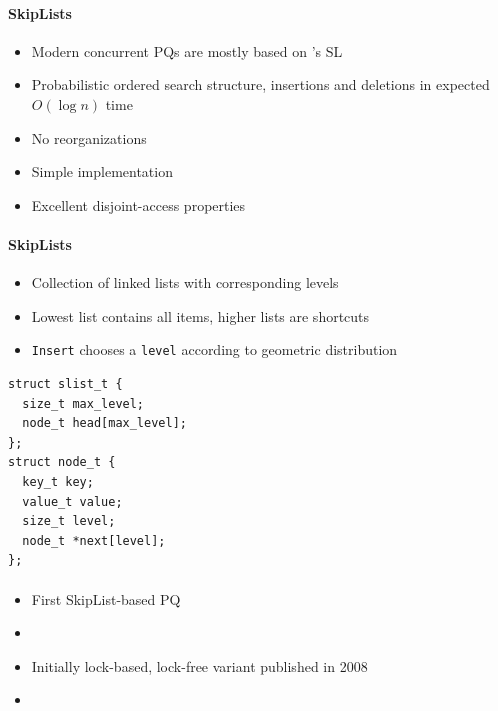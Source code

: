 \documentclass[usenames,dvipsnames]{beamer}
\begin{document}
\begin{frame}{}
\framesubtitle{SkipLists}

\begin{itemize}
\item Modern concurrent \acp{PQ} are mostly based on \citeauthor{pugh1990skip}'s \ac{SL}
\item Probabilistic ordered search structure, insertions and deletions in expected $O(\log n)$ time
\item No reorganizations
\item Simple implementation
\item Excellent disjoint-access properties
\end{itemize}
\end{frame}

\begin{frame}[fragile]{}
\framesubtitle{SkipLists}

\begin{itemize}
\item Collection of linked lists with corresponding levels
\item Lowest list contains all items, higher lists are shortcuts
\item \lstinline|Insert| chooses a \lstinline|level| according to geometric distribution
\end{itemize}

\begin{lstlisting}
struct slist_t {
  size_t max_level;
  node_t head[max_level];
};
struct node_t {
  key_t key;
  value_t value;
  size_t level;
  node_t *next[level];
};
\end{lstlisting}
\end{frame}


\begin{frame}{}
\framesubtitle{\citeauthor{shavit2000skiplist}}

\begin{itemize}
\item First SkipList-based \ac{PQ}
\item {}
\item Initially lock-based, lock-free variant published in 2008
\item {}
\end{itemize}
\end{frame}
\end{document}
